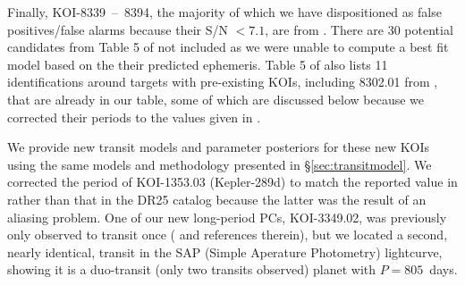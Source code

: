 \documentclass{aastex62}
\begin{document}
Finally, KOI-8339~--{~8394, the majority of which we have dispositioned as false positives/false alarms because their S/N $< 7.1$, are from \cite{Caceres:2019}. There are 30 potential candidates from Table 5 of \cite{Caceres:2019} not included as we were unable to compute a best fit model based on the their predicted ephemeris. Table 5 of \cite{Caceres:2019} also lists 11 identifications around targets with pre-existing KOIs, including 8302.01 from \cite{Sanchis-Ojeda:2014}, that are already in our table, some of which are discussed below because we corrected their periods to the values given in \cite{Caceres:2019}.}   

We provide new transit models and parameter posteriors for these new KOIs using the same models and methodology presented in \S\ref{sec:transitmodel}.  We corrected the period of KOI-1353.03 (Kepler-289d) to match the reported value in \cite{Schmitt:2014} rather than that in the DR25 catalog because the latter was the result of an aliasing problem. {One of our new long-period PCs, KOI-3349.02, was previously only observed to transit once (\citealt{Kawahara:2019} and references therein), but we located a second, nearly identical, transit in the SAP (Simple Aperature Photometry) lightcurve, showing it is a duo-transit (only two transits observed) planet with $P = 805$~days.}

%
%
%
%
\end{document}
